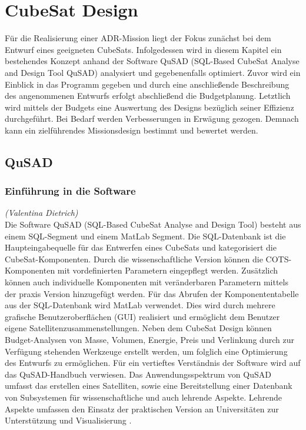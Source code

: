 \chapter{CubeSat Design}

	Für die Realisierung einer ADR-Mission liegt der Fokus zunächst bei dem Entwurf eines geeigneten CubeSats. Infolgedessen wird in diesem Kapitel ein bestehendes Konzept \cite{Lettau.} anhand der Software QuSAD (SQL-Based CubeSat Analyse and Design Tool QuSAD) analysiert und gegebenenfalls optimiert. Zuvor wird ein Einblick in das Programm gegeben und durch eine anschließende Beschreibung des angenommenen Entwurfs erfolgt abschließend die Budgetplanung. Letztlich wird mittels der Budgets eine Auswertung des Designs bezüglich seiner Effizienz durchgeführt. Bei Bedarf werden Verbesserungen in Erwägung gezogen. Demnach kann ein zielführendes Missionsdesign bestimmt und bewertet werden.
		
		\section{QuSAD}
			
			\subsection{Einführung in die Software}
	\hfill\emph{(Valentina Dietrich)}\\
	
		Die Software QuSAD (SQL-Based CubeSat Analyse and Design Tool) besteht aus einem SQL-Segment und einem MatLab Segment. Die SQL-Datenbank ist die Haupteingabequelle für das Entwerfen eines CubeSats und kategorisiert die CubeSat-Komponenten. Durch die wissenschaftliche Version können die COTS-Komponenten mit vordefinierten Parametern eingepflegt werden. Zusätzlich können auch individuelle Komponenten mit veränderbaren Parametern mittels der praxis Version hinzugefügt werden. Für das Abrufen der Komponententabelle aus der SQL-Datenbank wird MatLab verwendet. Dies wird durch mehrere grafische Benutzeroberflächen (GUI) realisiert und ermöglicht dem Benutzer eigene Satellitenzusammenstellungen. Neben dem CubeSat Design können Budget-Analysen von Masse, Volumen, Energie, Preis und Verlinkung durch zur Verfügung stehenden Werkzeuge erstellt werden, um folglich eine Optimierung des Entwurfs zu ermöglichen. Für ein vertieftes Verständnis der Software wird auf das QuSAD-Handbuch \cite{Farahvashi.2016} verwiesen. Das Anwendungsspektrum von QuSAD umfasst das erstellen eines Satelliten, sowie eine Bereitstellung einer Datenbank von Subsystemen für wissenschaftliche und auch lehrende Aspekte. Lehrende Aspekte umfassen den Einsatz der praktischen Version an Universitäten zur Unterstützung und Visualisierung \cite{Farahvashi.2016b}. 
			
